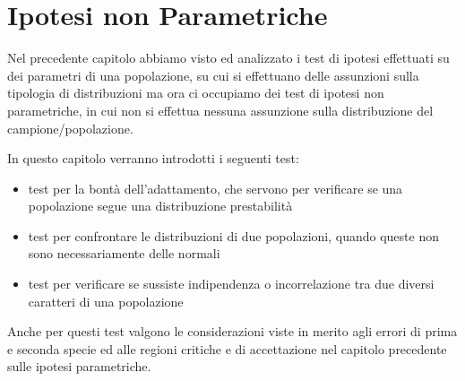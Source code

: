 \chapter{Ipotesi non Parametriche}
Nel precedente capitolo abbiamo visto ed analizzato i test di ipotesi effettuati su dei parametri di una popolazione, su
cui si effettuano delle assunzioni sulla tipologia di distribuzioni ma ora ci occupiamo dei test di ipotesi non
parametriche, in cui non si effettua nessuna assunzione sulla distribuzione del campione/popolazione.  

In questo capitolo verranno introdotti i seguenti test:
\begin{itemize}
    \item test per la bontà dell'adattamento, che servono per verificare se una popolazione segue una distribuzione prestabilità
    \item test per confrontare le distribuzioni di due popolazioni, quando queste non sono necessariamente delle normali
    \item test per verificare se sussiste indipendenza o incorrelazione tra due diversi caratteri di una popolazione
\end{itemize}
Anche per questi test valgono le considerazioni viste in merito agli errori di prima e seconda specie ed alle regioni
critiche e di accettazione nel capitolo precedente sulle ipotesi parametriche.

